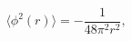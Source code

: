 \begin{equation}
\langle\phi ^{2}(r)\rangle=
-\frac{1}{48\pi^{2}r^{2}},
\label{sphi2}
\end{equation}

